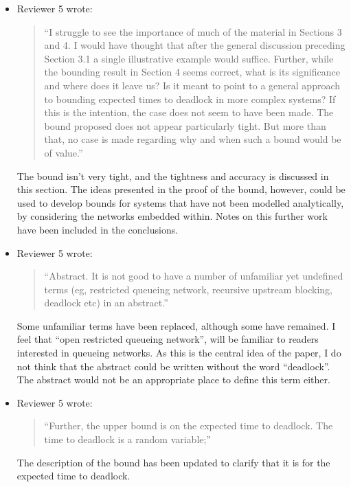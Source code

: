 \documentclass{article}
\begin{document}
\begin{itemize}
\item Reviewer 5 wrote:
\begin{quote}
``I struggle to see the importance of much of the material in Sections 3 and 4.
I would have thought that after the general discussion preceding Section 3.1
a single illustrative example would suffice.
Further, while the bounding result in Section 4 seems correct, what is its
significance and where does it leave us?
Is it meant to point to a general approach to bounding expected times to
deadlock in more complex systems?
If this is the intention, the case does not seem to have been made.
The bound proposed does not appear particularly tight.
But more than that, no case is made regarding why and when such a bound
would be of value.''
\end{quote}
The bound isn't very tight, and the tightness and accuracy is discussed in
this section.
The ideas presented in the proof of the bound, however, could be used to
develop bounds for systems that have not been modelled analytically, by
considering the networks embedded within.
Notes on this further work have been included in the conclusions.

\item Reviewer 5 wrote:
\begin{quote}
``Abstract. It is not good to have a number of unfamiliar yet undefined terms
(eg, restricted queueing network, recursive upstream blocking, deadlock etc)
in an abstract.''
\end{quote}
Some unfamiliar terms have been replaced, although some have remained.
I feel that ``open restricted queueing network'', will be
familiar to readers interested in queueing networks.
As this is the central idea of the paper, I do not think that the abstract
could be written without the word ``deadlock''.
The abstract would not be an appropriate place to define this term either.

\item Reviewer 5 wrote:
\begin{quote}
``Further, the upper bound is on the expected time to deadlock.
The time to deadlock is a random variable;''
\end{quote}
The description of the bound has been updated to clarify that it is for the
expected time to deadlock.


\end{itemize}
\end{document}

